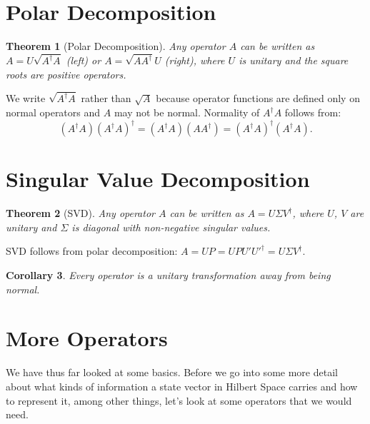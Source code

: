 \documentclass[12pt, a4paper, oneside]{report}
\theoremstyle{plain}
\newtheorem{theorem}{Theorem}[chapter]
\newtheorem{corollary}[theorem]{Corollary}
\theoremstyle{definition}
\theoremstyle{remark}
\begin{document}
\section{Polar Decomposition}

\begin{theorem}[Polar Decomposition]
Any operator $A$ can be written as $A = U\sqrt{A^\dagger A}$ (left) or $A = \sqrt{AA^\dagger}U$
(right), where $U$ is unitary and the square roots are positive operators.
\end{theorem}

We write $\sqrt{A^\dagger A}$ rather than $\sqrt{A}$ because operator functions are defined
only on normal operators and $A$ may not be normal. Normality of $A^\dagger A$ follows from:
\[
  (A^\dagger A)(A^\dagger A)^\dagger = (A^\dagger A)(AA^\dagger) = (A^\dagger A)^\dagger(A^\dagger A).
\]

\section{Singular Value Decomposition}

\begin{theorem}[SVD]
Any operator $A$ can be written as $A = U\Sigma V^\dagger$, where $U$, $V$ are unitary
and $\Sigma$ is diagonal with non-negative singular values.
\end{theorem}

SVD follows from polar decomposition: $A = UP = UPU'U'^\dagger = U\Sigma V^\dagger$.

\begin{corollary}
Every operator is a unitary transformation away from being normal.
\end{corollary}





\section{More Operators}

We have thus far looked at some basics. Before we go into some more detail about what kinds of information a state vector in Hilbert Space carries and how to represent it, among other things, let's look at some operators that we would need.
\end{document}

